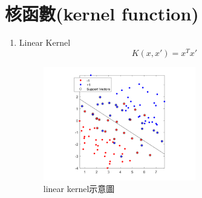 \section{核函數(kernel function)}
\begin{enumerate}
	\item
	      Linear Kernel
	      \begin{equation}
		      \label{eqn:LinearKernel}
		      K(x,x')=x^Tx'
	      \end{equation}

\begin{figure}[H]
	\centerline{\includegraphics[height=5cm]{pic/linear kernel.png}}
	\caption{linear kernel示意圖}
	\label{fig:linear kernel}
\end{figure}


\end{enumerate}
